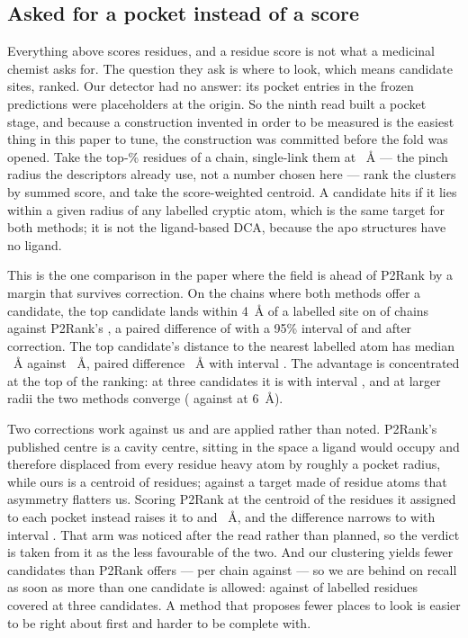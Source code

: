 \documentclass[11pt]{article}
\begin{document}
\subsection{Asked for a pocket instead of a score}
\label{sec:pockets}
Everything above scores residues, and a residue score is not what a medicinal
chemist asks for. The question they ask is where to look, which means candidate
sites, ranked. Our detector had no answer: its pocket entries in the frozen
predictions were placeholders at the origin. So the ninth read built a pocket
stage, and because a construction invented in order to be measured is the easiest
thing in this paper to tune, the construction was committed before the fold was
opened. Take the top-\AlgOperatingPct{}\% residues of a chain, single-link them at
\PkCut{}~\AA{} --- the pinch radius the descriptors already use, not a number
chosen here --- rank the clusters by summed score, and take the score-weighted
centroid. A candidate hits if it lies within a given radius of any labelled
cryptic atom, which is the same target for both methods; it is not the
ligand-based DCA, because the apo structures have no ligand.

This is the one comparison in the paper where the field is ahead of P2Rank by a
margin that survives correction. On the \PkNPaired{} chains where both methods
offer a candidate, the top candidate lands within 4~\AA{} of a labelled site on
\PkOursOneFour{} of chains against P2Rank's \PkTheirsOneFour{}, a paired
difference of \PkDeltaOneFour{} with a 95\% interval of \PkCIOneFour{} and
\PkBonfOneFour{} after correction. The top candidate's distance to the nearest
labelled atom has median \PkOursDist{}~\AA{} against \PkTheirsDist{}~\AA{},
paired difference \PkDistDelta{}~\AA{} with interval \PkDistCI{}. The advantage
is concentrated at the top of the ranking: at three candidates it is
\PkDeltaThreeFour{} with interval \PkCIThreeFour{}, and at larger radii the two
methods converge (\PkOursOneSix{} against \PkTheirsOneSix{} at 6~\AA{}).

Two corrections work against us and are applied rather than noted. P2Rank's
published centre is a cavity centre, sitting in the space a ligand would occupy
and therefore displaced from every residue heavy atom by roughly a pocket radius,
while ours is a centroid of residues; against a target made of residue atoms that
asymmetry flatters us. Scoring P2Rank at the centroid of the residues it assigned
to each pocket instead raises it to \PkCorrTheirsOneFour{} and \PkCorrDist{}~\AA{},
and the difference narrows to \PkCorrDeltaOneFour{} with interval
\PkCorrCIOneFour{}. That arm was noticed after the read rather than planned, so
the verdict is taken from it as the less favourable of the two. And our clustering
yields fewer candidates than P2Rank offers --- \PkOursCandMean{} per chain against
\PkTheirsCandMean{} --- so we are behind on recall as soon as more than one
candidate is allowed: \PkRecallOursThree{} against \PkRecallTheirsThree{} of labelled
residues covered at three candidates. A method that proposes fewer places to look
is easier to be right about first and harder to be complete with.
\end{document}
